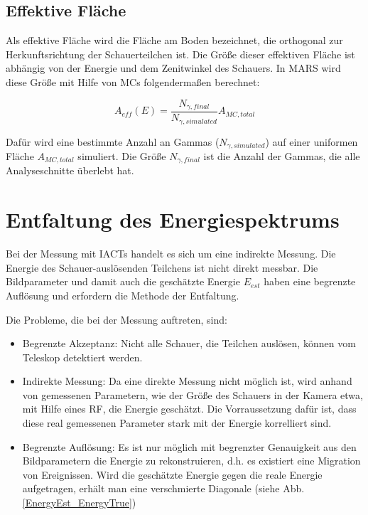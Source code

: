 \subsection{Effektive Fläche}
Als effektive Fläche wird die Fläche am Boden bezeichnet, die orthogonal zur Herkunftsrichtung der Schauerteilchen ist.
Die Größe dieser effektiven Fläche ist abhängig von der Energie und dem Zenitwinkel des Schauers.
In MARS wird diese Größe mit Hilfe von MCs folgendermaßen berechnet:

\begin{equation}
 A_{eff}(E)=\frac{N_{\gamma, final}}{N_{\gamma, simulated}}A_{MC, total}
\end{equation}

Dafür wird eine bestimmte Anzahl an Gammas ($N_{\gamma, simulated}$) auf einer uniformen Fläche $A_{MC,total}$ simuliert. 
Die Größe $N_{\gamma, final}$ ist die Anzahl der Gammas, die alle Analyseschnitte überlebt hat.


\section{Entfaltung des Energiespektrums}
\label{sec:Unfolding}
Bei der Messung mit IACTs handelt es sich um eine indirekte Messung.
Die Energie des Schauer-auslösenden Teilchens ist nicht direkt messbar.
Die Bildparameter und damit auch die geschätzte Energie $E_{est}$ haben eine begrenzte Auflösung und erfordern die Methode der Entfaltung.

Die Probleme, die bei der Messung auftreten, sind:

\begin{itemize}
 \item Begrenzte Akzeptanz: Nicht alle Schauer, die Teilchen auslösen, können vom Teleskop detektiert werden.
 \item Indirekte Messung: Da eine direkte Messung nicht möglich ist, wird anhand von gemessenen Parametern, wie der Größe des Schauers in der Kamera etwa, mit Hilfe eines RF, die Energie geschätzt.
       Die Vorraussetzung dafür ist, dass diese real gemessenen Parameter stark mit der Energie korrelliert sind.
 \item Begrenzte Auflösung: Es ist nur möglich mit begrenzter Genauigkeit aus den Bildparametern die Energie zu rekonstruieren, d.h. es existiert eine Migration von Ereignissen.
       Wird die geschätzte Energie gegen die reale Energie aufgetragen, erhält man eine verschmierte Diagonale (siehe Abb.\ref{EnergyEst_EnergyTrue})
\end{itemize}

